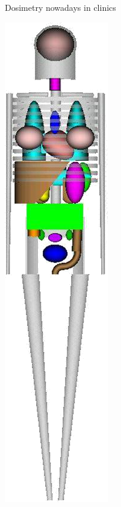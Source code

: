 \documentclass[ignorenonframetext,]{beamer}
\begin{document}
\begin{frame}{Dosimetry nowadays in clinics}
\begin{center}
\includegraphics[height=.6\textheight]{imgs/phantom1.png} \hspace{2cm}

\end{center}
\end{frame}
\end{document}
